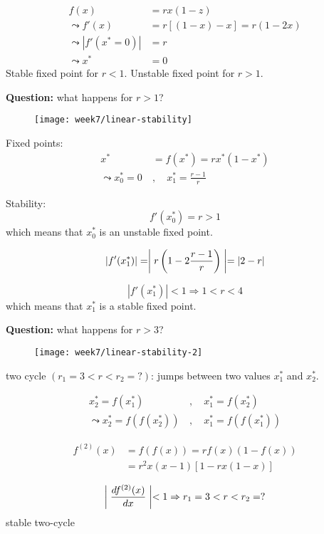 \begin{align}
f(x) &= rx(1-z) \\
\leadsto
f'(x) &= r[(1-x)-x]=r(1-2x) \\
\leadsto
|f'(x^*=0)|&=r\\
\leadsto
x^* &= 0
\end{align}
Stable fixed point for $r<1$. Unstable fixed point for $r>1$.

\textbf{Question:} what happens for $r>1$?
\begin{figure}[h]
    \centering
    \texttt{[image: week7/linear-stability]}\\
    \caption{}
    \label{fig:linear-stability}
\end{figure}

Fixed points:
\begin{align}
x^* &= f(x^*) = rx^*(1-x^*)\\
\leadsto
x_0^*=0\ &,\quad x_1^* = \frac{r-1}{r}
\end{align}

Stability:
\begin{equation}
f'(x_0^*) = r>1
\end{equation}
which means that $x_0^*$ is an unstable fixed point.

\begin{equation}
|f'(x_1^*)|=\biggm\vert r\left(1-2\frac{r-1}{r}\right)\biggm\vert=|2-r|
\end{equation}

\begin{equation}
|f'(x_1^*)| < 1 \Rightarrow 1<r<4
\end{equation}
which means that $x_1^*$ is a stable fixed point.

\textbf{Question:} what happens for $r>3$?

\begin{figure}[p]
    \centering
    \texttt{[image: week7/linear-stability-2]}\\
    \caption{}
    \label{fig:linear-stability-2}
\end{figure}

\begin{framed}
two cycle $(r_1=3<r<r_2=?)$: jumps between two values $x_1^*$ and $x_2^*$.

\begin{align}
x_2^*=f(x_1^*)\ &,\quad x_1^*=f(x_2^*) \\
\leadsto
x_2^* = f(f(x_2^*))\, &,\quad x_1^*=f(f(x_1^*))
\end{align}

\begin{align}
f^{(2)}(x) &= f(f(x)) = rf(x)(1-f(x))\\
&= r^2x(x-1)[1-rx(1-x)]
\end{align}

\begin{equation}
\biggm\vert\frac{d f^{(2)}(x)}{d x}\biggm\vert<1 \Rightarrow r_1=3<r<r_2=?
\end{equation}
stable two-cycle
\end{framed}

